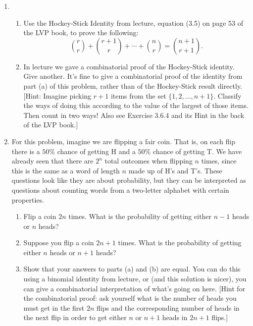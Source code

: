 \documentclass[11pt]{article}
\begin{document}
\begin{enumerate}
\item 
\begin{enumerate} 
\item Use the Hockey-Stick Identity from lecture, equation (3.5) on page 53 of the LVP book, to prove the following:
\[ 
\binom{r}{r} + \binom{r+1}{r} + \cdots + \binom{n}{r} = \binom{n+1}{r+1}.
\]
\item In lecture we gave a combinatorial proof of the Hockey-Stick identity.  Give another.  It's fine to give a combinatorial proof of the identity from part (a) of this problem, rather than of the Hockey-Stick result directly. 
[Hint: Imagine picking $r+1$ items from the set $\{1,2,...,n+1\}$. Classify the ways of doing this according to the value of the largest of those items. Then count in two ways! Also see Exercise 3.6.4 and its Hint in the back of the LVP book.]
\end{enumerate}



\item For this problem, imagine we are flipping a fair coin.  That is, on each flip there is a $50\%$ chance of getting H and a $50\%$ chance of getting T.  We have already seen that there are $2^n$ total outcomes when flipping $n$ times, since this is the same as a word of length $n$ made up of H's and T's.  These questions look like they are about probability, but they can be interpreted as questions about counting words from a two-letter alphabet with certain properties.
\begin{enumerate}
\item Flip a coin $2n$ times.  What is the probability of getting either $n-1$ heads or $n$ heads?
\item Suppose you flip a coin $2n+1$ times.  What is the probability of getting either $n$ heads or $n+1$ heads? 
\item Show that your answers to parts (a) and (b) are equal.  You can do this using a binomial identity from lecture, or (and this solution is nicer), you can give a combinatorial interpretation of what's going on here. [Hint for the combinatorial proof: ask yourself what is the number of heads you must get in the first $2n$ flips and the corresponding number of heads in the next flip in order to get either $n$ or $n+1$ heads in $2n+1$ flips.]
\end{enumerate}



\end{enumerate}
\end{document}

